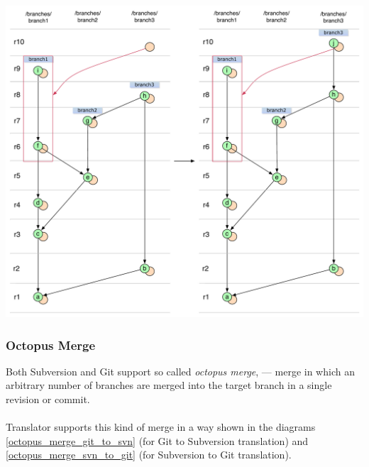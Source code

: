 \begin{center}
\includegraphics[width=\textwidth]{img/diagrams/no_merge_commit_cherry_pick_sequence_svn_to_git.pdf}%
\label{no_merge_commit_cherry_pick_sequence_svn_to_git}%
\end{center}

\subsubsection{Octopus Merge}

Both Subversion and Git support so called \emph{octopus merge}, --- merge in which an arbitrary number of branches are merged into the target branch in a single revision or commit. 
\\\\
Translator supports this kind of merge in a way shown in the diagrams \ref{octopus_merge_git_to_svn} (for Git to Subversion translation) and \ref{octopus_merge_svn_to_git} (for Subversion to Git translation).

